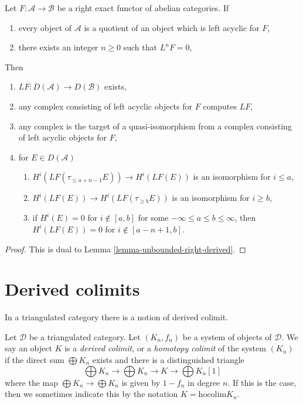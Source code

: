 \begin{lemma}
\label{lemma-unbounded-left-derived}
Let $F : \mathcal{A} \to \mathcal{B}$ be a right exact functor of
abelian categories. If
\begin{enumerate}
\item every object of $\mathcal{A}$ is a quotient of an object
which is left acyclic for $F$,
\item there exists an integer $n \geq 0$ such that $L^nF = 0$,
\end{enumerate}
Then
\begin{enumerate}
\item $LF : D(\mathcal{A}) \to D(\mathcal{B})$ exists,
\item any complex consisting of left acyclic objects for $F$ computes $LF$,
\item any complex is the target of a quasi-isomorphism from a complex
consisting of left acyclic objects for $F$,
\item for $E \in D(\mathcal{A})$
\begin{enumerate}
\item $H^i(LF(\tau_{\leq a + n - 1}E)) \to H^i(LF(E))$ is an isomorphism
for $i \leq a$,
\item $H^i(LF(E)) \to H^i(LF(\tau_{\geq b}E))$ is an isomorphism
for $i \geq b$,
\item if $H^i(E) = 0$ for $i \not \in [a, b]$ for some
$-\infty \leq a \leq b \leq \infty$, then $H^i(LF(E)) = 0$
for $i \not \in [a - n + 1, b]$.
\end{enumerate}
\end{enumerate}
\end{lemma}

\begin{proof}
This is dual to Lemma \ref{lemma-unbounded-right-derived}.
\end{proof}






\section{Derived colimits}
\label{section-derived-colimit}

\noindent
In a triangulated category there is a notion of derived colimit.

\begin{definition}
\label{definition-derived-colimit}
Let $\mathcal{D}$ be a triangulated category.
Let $(K_n, f_n)$ be a system of objects of $\mathcal{D}$.
We say an object $K$ is a {\it derived colimit}, or a
{\it homotopy colimit} of the system $(K_n)$ if
the direct sum $\bigoplus K_n$ exists and there is a distinguished triangle
$$
\bigoplus K_n \to \bigoplus K_n \to K \to \bigoplus K_n[1]
$$
where the map $\bigoplus K_n \to \bigoplus K_n$ is given
by $1 - f_n$ in degree $n$. If this is the
case, then we sometimes indicate this by the notation
$K = \text{hocolim} K_n$.
\end{definition}

